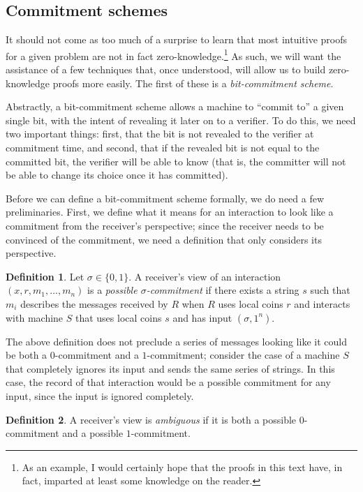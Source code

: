 \documentclass[english,12pt]{reedthesis}
\theoremstyle{plain}
\theoremstyle{definition}
\newtheorem{defn}[defn]{Definition}
\theoremstyle{remark}
\begin{document}
\subsection{Commitment schemes}\label{sec:commitment-scheme}

It should not come as too much of a surprise to learn that most intuitive proofs
for a given problem are not in fact zero-knowledge.\footnote{As an example, I
  would certainly hope that the proofs in this text have, in fact, imparted at
  least some knowledge on the reader.} As such, we will want the assistance of a
few techniques that, once understood, will allow us to build zero-knowledge
proofs more easily. The first of these is a \emph{bit-commitment scheme}.

Abstractly, a bit-commitment scheme allows a machine to ``commit to'' a given
single bit, with the intent of revealing it later on to a verifier. To do this,
we need two important things: first, that the bit is not revealed to the
verifier at commitment time, and second, that if the revealed bit is not equal
to the committed bit, the verifier will be able to know (that is, the committer
will not be able to change its choice once it has committed).

Before we can define a bit-commitment scheme formally, we do need a few
preliminaries. First, we define what it means for an interaction to look like a
commitment from the receiver's perspective; since the receiver needs to be
convinced of the commitment, we need a definition that only considers its
perspective.

\begin{defn}\label{def:possible-commit}
  Let $\sigma \in \{0, 1\}$. A receiver's view of an interaction
  $(x, r, m_{1}, \ldots, m_{n})$ is a \emph{possible $\sigma$-commitment} if there exists
  a string $s$ such that $m_{i}$ describes the messages received by $R$ when $R$
  uses local coins $r$ and interacts with machine $S$ that uses local coins $s$
  and has input $(\sigma, 1^{n})$.
\end{defn}

The above definition does not preclude a series of messages looking like it
could be both a $0$-commitment and a $1$-commitment; consider the case of a
machine $S$ that completely ignores its input and sends the same series of
strings. In this case, the record of that interaction would be a possible
commitment for any input, since the input is ignored completely.

\begin{defn}\label{def:ambiguous-view}
  A receiver's view is \emph{ambiguous} if it is both a possible $0$-commitment
  and a possible $1$-commitment.
\end{defn}
\end{document}

